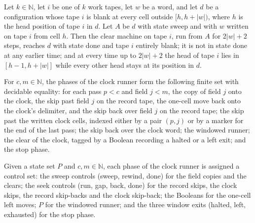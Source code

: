 \begin{lemma}
\label{Turing.cw_clear_patch}
\leanok
{}
Let $k\in\mathbb{N}$, let $i$ be one of $k$ work tapes, let $w$ be a word, and let $d$ be a
configuration whose tape $i$ is blank at every cell outside $[h,h+|w|)$, where $h$ is the head
position of tape $i$ in $d$. Let $A$ be $d$ with state sweep and with $w$ written on tape $i$
from cell $h$. Then the clear machine on tape $i$, run from $A$ for $2|w|+2$ steps, reaches $d$
with state done and tape $i$ entirely blank; it is not in state done at any earlier time; and
at every time up to $2|w|+2$ the head of tape $i$ lies in $[h-1,h+|w|]$ while every other head
stays at its position in $d$.
\end{lemma}

\begin{definition}
\label{Turing.cw_Idx}
\leanok
For $c,m\in\mathbb{N}$, the phases of the clock runner form the following finite set with
decidable equality: for each pass $p<c$ and field $j<m$, the copy of field $j$ onto the clock,
the skip past field $j$ on the record tape, the one-cell move back onto the clock's delimiter,
and the skip back over field $j$ on the record tape; the skip past the written clock cells,
indexed either by a pair $(p,j)$ or by a marker for the end of the last pass; the skip back
over the clock word; the windowed runner; the clear of the clock, tagged by a Boolean recording
a halted or a left exit; and the stop phase.
\end{definition}

\begin{definition}
\label{Turing.cw_Ctrl}
\leanok
{}
Given a state set $P$ and $c,m\in\mathbb{N}$, each phase of the clock runner is assigned a
control set: the sweep controls (sweep, rewind, done) for the field copies and the clears; the
seek controls (run, gap, back, done) for the record skips, the clock skips, the record
skip-backs and the clock skip-back; the Booleans for the one-cell left moves; $P$ for the
windowed runner; and the three window exits (halted, left, exhausted) for the stop phase.
\end{definition}

